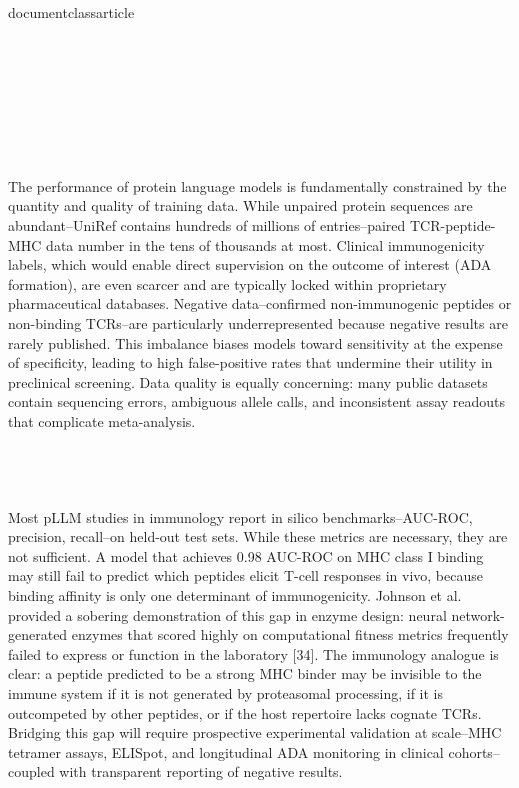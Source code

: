 \\documentclass{article}
\begin{document}
\section{}

\subsection{}

The performance of protein language models is fundamentally constrained by the quantity and quality of training data. While unpaired protein sequences are abundant--UniRef contains hundreds of millions of entries--paired TCR-peptide-MHC data number in the tens of thousands at most. Clinical immunogenicity labels, which would enable direct supervision on the outcome of interest (ADA formation), are even scarcer and are typically locked within proprietary pharmaceutical databases. Negative data--confirmed non-immunogenic peptides or non-binding TCRs--are particularly underrepresented because negative results are rarely published. This imbalance biases models toward sensitivity at the expense of specificity, leading to high false-positive rates that undermine their utility in preclinical screening. Data quality is equally concerning: many public datasets contain sequencing errors, ambiguous allele calls, and inconsistent assay readouts that complicate meta-analysis.

\subsection{}

Most pLLM studies in immunology report in silico benchmarks--AUC-ROC, precision, recall--on held-out test sets. While these metrics are necessary, they are not sufficient. A model that achieves 0.98 AUC-ROC on MHC class I binding may still fail to predict which peptides elicit T-cell responses in vivo, because binding affinity is only one determinant of immunogenicity. Johnson et al. provided a sobering demonstration of this gap in enzyme design: neural network-generated enzymes that scored highly on computational fitness metrics frequently failed to express or function in the laboratory [34]. The immunology analogue is clear: a peptide predicted to be a strong MHC binder may be invisible to the immune system if it is not generated by proteasomal processing, if it is outcompeted by other peptides, or if the host repertoire lacks cognate TCRs. Bridging this gap will require prospective experimental validation at scale--MHC tetramer assays, ELISpot, and longitudinal ADA monitoring in clinical cohorts--coupled with transparent reporting of negative results.
\end{document}
